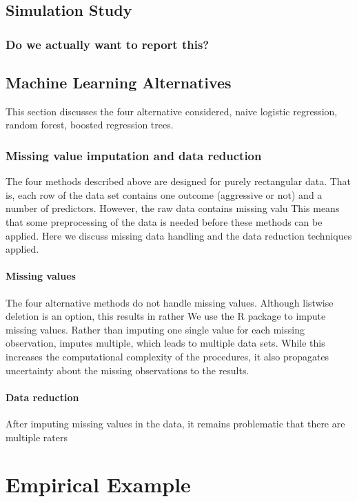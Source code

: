 \documentclass[a4paper,11pt]{article}
\begin{document}
\subsection{Simulation Study}

\subsubsection{Do we actually want to report this?}

\subsection{Machine Learning Alternatives}
This section discusses the four alternative considered, naive logistic regression, random forest, boosted regression trees.
\subsubsection{Missing value imputation and data reduction}
The four methods described above are designed for purely rectangular data.
That is, each row of the data set contains one outcome (aggressive or not) and a number of predictors.
However, the raw data contains missing valu
This means that some preprocessing of the data is needed before these methods can be applied.
Here we discuss missing data handling and the data reduction techniques applied.

\paragraph{Missing values}
The four alternative methods do not handle missing values.
Although listwise deletion is an option, this results in rather 
We use the R package  \parencite{vanBuuren2011mice} to impute missing values.
Rather than imputing one single value for each missing observation,  imputes multiple, which leads to multiple data sets.
While this increases the computational complexity of the procedures, it also propagates uncertainty about the missing observations to the results.


\paragraph{Data reduction}
After imputing missing values in the data, it remains problematic that there are multiple raters


\section{Empirical Example}
\end{document}
